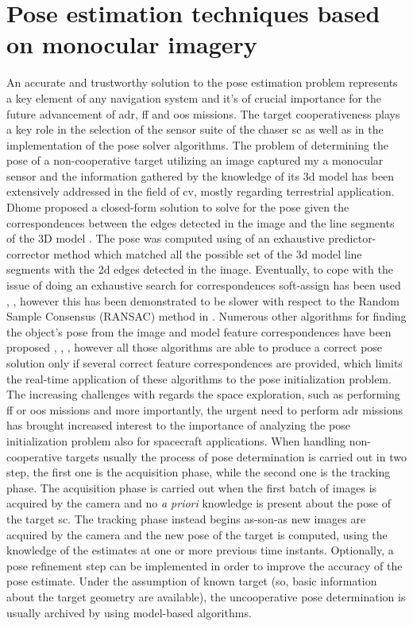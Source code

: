 \section{Pose estimation techniques based on monocular imagery}
An accurate and trustworthy solution to the pose estimation problem represents a key element of any navigation system and it's of crucial importance for the future advancement of \acrshort{adr}, \acrshort{ff} and \acrshort{oos} missions. The target cooperativeness plays a key role in the selection of the sensor suite of the chaser \acrshort{sc} as well as in the implementation of the pose solver algorithms.
The problem of determining the pose of a non-cooperative target utilizing an image captured my a monocular sensor and the information gathered by the knowledge of its \acrshort{3d} model has been extensively addressed in the field of \acrshort{cv}, mostly regarding terrestrial application. Dhome proposed a closed-form solution to solve for the pose given the correspondences between the edges detected in the image and the line segments of the 3D model \cite{Dhome1989}. The pose was computed using of an exhaustive predictor-corrector method which matched all the possible set of the \acrshort{3d} model line segments with the \acrshort{2d} edges detected in the image. Eventually, to cope with the issue of doing an exhaustive search for correspondences soft-assign has been used \cite{Gold1994}, \cite{David2004}, however this has been demonstrated to be slower with respect to the Random Sample Consensus (RANSAC) method in \cite{Attia2016}. Numerous other algorithms for finding the object's pose from the image and model feature correspondences have been proposed \cite{Mirzaei2011}, \cite{Xu2017}, \cite{10.1007/s11263-008-0152-6}, however all those algorithms are able to produce a correct pose solution only if several correct feature correspondences are provided, which limits the real-time application of these algorithms to the pose initialization problem.
The increasing challenges with regards the space exploration, such as performing \acrshort{ff} or \acrshort{oos} missions and more importantly, the urgent need to perform \acrshort{adr} missions has brought increased interest to the importance of analyzing the pose initialization problem also for spacecraft applications. When handling non-cooperative targets usually the process of pose determination is carried out in two step, the first one is the acquisition phase, while the second one is the tracking phase. The acquisition phase is carried out when the first batch of images is acquired by the camera and no \textit{a priori} knowledge is present about the pose of the target \acrshort{sc}. The tracking phase instead begins as-son-as new images are acquired by the camera and the new pose of the target is computed, using the knowledge of the estimates at one or more previous time instants. Optionally, a pose refinement step can be implemented in order to improve the accuracy of the pose estimate. Under the assumption of known target (so, basic information about the target geometry are available), the uncooperative pose determination is usually archived by using model-based algorithms.
